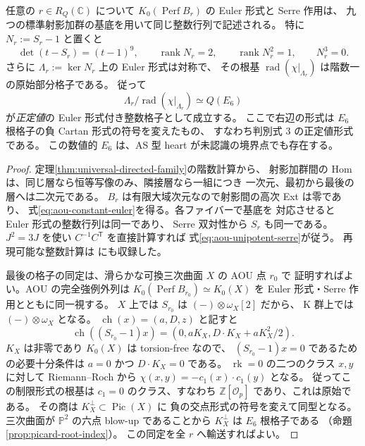 \begin{theorem}
\label{thm:aou-numerical-E6}
任意の $r\in R_Q(\mathbb C)$ について
$K_0(\operatorname{Perf}B_r)$ の Euler 形式と Serre 作用は、
九つの標準射影加群の基底を用いて同じ整数行列で記述される。
特に $N_r:=S_r-1$ と置くと
\begin{equation}\label{eq:aou-unipotent-serre}
 \det(t-S_r)=(t-1)^9,\qquad
 \operatorname{rank}N_r=2,\qquad
 \operatorname{rank}N_r^2=1,\qquad N_r^3=0.
\end{equation}
さらに $\Lambda_r:=\ker N_r$ 上の Euler 形式は対称で、
その根基 $\operatorname{rad}(\chi|_{\Lambda_r})$ は階数一の原始部分格子である。
従って
\begin{equation}\label{eq:aou-numerical-root}
 \Lambda_r/\operatorname{rad}(\chi|_{\Lambda_r})
 \simeq Q(E_6)
\end{equation}
が\emph{正定値}の Euler 形式付き整数格子として成立する。
ここで右辺の形式は $E_6$ 根格子の負 Cartan 形式の符号を変えたもの、
すなわち判別式 $3$ の正定値形式である。
この数値的 $E_6$ は、AS 型 heart が未認識の境界点でも存在する。
\end{theorem}
\begin{proof}
定理\ref{thm:universal-directed-family}の階数計算から、
射影加群間の Hom は、同じ層なら恒等写像のみ、隣接層なら一組につき
一次元、最初から最後の層へは二次元である。
$B_r$ は有限大域次元なので射影間の高次 Ext は零であり、
式\eqref{eq:aou-constant-euler}を得る。各ファイバーで基底を
対応させると Euler 形式の整数行列は同一であり、
Serre 双対性から $S_r$ も同一である。
$J^2=3J$ を使い $C^{-1}C^{\mathsf T}$ を直接計算すれば
式\eqref{eq:aou-unipotent-serre}が従う。
再現可能な整数計算は
 にも収録した。

最後の格子の同定は、滑らかな可換三次曲面 $X$ の AOU 点 $r_0$ で
証明すればよい。AOU の完全強例外列は
$K_0(\operatorname{Perf}B_{r_0})\simeq K_0(X)$ を Euler 形式・Serre 作用とともに同一視する。
$X$ 上では $S_{r_0}$ は $(-)\otimes\omega_X[2]$ だから、
K 群上では $(-)\otimes\omega_X$ となる。
$\operatorname{ch}(x)=(a,D,z)$ と記すと
\[
 \operatorname{ch}((S_{r_0}-1)x)
   =(0,aK_X,D\cdot K_X+aK_X^2/2).
\]
$K_X$ は非零であり $K_0(X)$ は torsion-free なので、
$(S_{r_0}-1)x=0$ であるための必要十分条件は
$a=0$ かつ $D\cdot K_X=0$ である。
$\operatorname{rk}=0$ の二つのクラス $x,y$ に対して
Riemann--Roch から $\chi(x,y)=-c_1(x)\cdot c_1(y)$ となる。
従ってこの制限形式の根基は $c_1=0$ のクラス、すなわち
$\mathbb Z[\mathcal O_p]$ であり、これは原始である。
その商は $K_X^\perp\subset\operatorname{Pic}(X)$ に
負の交点形式の符号を変えて同型となる。
三次曲面が $\mathbb P^2$ の六点 blow-up であることから
$K_X^\perp$ は $E_6$ 根格子である
（命題\ref{prop:picard-root-index}）。
この同定を全 $r$ へ輸送すればよい。
\end{proof}

